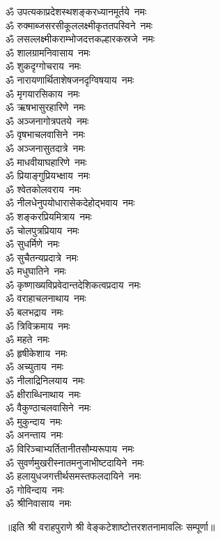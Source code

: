 \begin{multicols}{2}
\begin{flushleft}
ॐ उपत्यकाप्रदेशस्थशङ्कर\-ध्यानमूर्तये~नमः\\
ॐ रुक्माब्जसरसीकूललक्ष्मीकृत\-तपस्विने~नमः\\
ॐ लसल्लक्ष्मीकराम्भोजदत्त\-कल्हारकस्रजे~नमः\\
ॐ शालग्रामनिवासाय~नमः\\
ॐ शुकदृग्गोचराय~नमः\\
ॐ नारायणार्थिताशेषजन\-दृग्विषयाय~नमः\\
ॐ मृगयारसिकाय~नमः\\
ॐ ऋषभासुरहारिणे~नमः\hfill{}\\
ॐ अञ्जनागोत्रपतये~नमः\\
ॐ वृषभाचलवासिने~नमः\\
ॐ अञ्जनासुतदात्रे~नमः\\
ॐ माधवीयाघहारिणे~नमः\\
ॐ प्रियाङ्गुप्रियभ्क्षाय~नमः\\
ॐ श्वेतकोलवराय~नमः\\
ॐ नीलधेनुपयोधारासेक\-देहोद्भवाय~नमः\\
ॐ शङ्करप्रियमित्राय~नमः\\
ॐ चोलपुत्रप्रियाय~नमः\\
ॐ सुधर्मिणे~नमः\hfill{}\\
ॐ सुचैतन्यप्रदात्रे~नमः\\
ॐ मधुघातिने~नमः\\
ॐ कृष्णाख्यविप्रवेदान्त\-देशिकत्व\-प्रदाय~नमः\\
ॐ वराहाचलनाथाय~नमः\\
ॐ बलभद्राय~नमः\\
ॐ त्रिविक्रमाय~नमः\\
ॐ महते~नमः\\
ॐ हृषीकेशाय~नमः\\
ॐ अच्युताय~नमः\\
ॐ नीलाद्रिनिलयाय~नमः\hfill{}\\
ॐ क्षीराब्धिनाथाय~नमः\\
ॐ वैकुण्ठाचलवासिने~नमः\\
ॐ मुकुन्दाय~नमः\\
ॐ अनन्ताय~नमः\\
ॐ विरिञ्चाभ्यर्तितानीत\-सौम्य\-रूपाय~नमः\\
ॐ सुवर्णमुखरीस्नातमनुजाभीष्ट\-दायिने~नमः\\
ॐ हलायुधजगत्तीर्थसमस्त\-फलदायिने~नमः\\
ॐ गोविन्दाय~नमः\\
ॐ श्रीनिवासाय~नमः\\
\end{flushleft}
\end{multicols}
॥इति श्री वराहपुराणे श्री वेङ्कटेशाष्टोत्तरशतनामावलिः सम्पूर्णा॥
